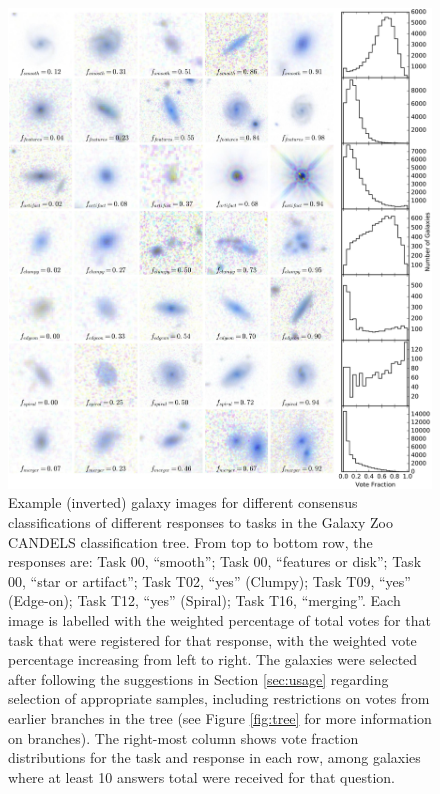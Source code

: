 \documentclass[useAMS,usenatbib]{mn2e}
\begin{document}
{%
\begin{figure}
\includegraphics[scale=0.875]{mosaic_inv_with_hists_sm2.png}
\caption{
Example (inverted) galaxy images for different consensus classifications of different responses to tasks in the Galaxy Zoo CANDELS classification tree. From top to bottom row, the responses are: Task 00, ``smooth''; Task 00, ``features or disk''; Task 00, ``star or artifact''; Task T02, ``yes'' (Clumpy); Task T09, ``yes'' (Edge-on); Task T12, ``yes'' (Spiral); Task T16, ``merging''. Each image is labelled with the weighted percentage of total votes for that task that were registered for that response, with the weighted vote percentage increasing from left to right. The galaxies were selected after following the suggestions in Section \ref{sec:usage} regarding selection of appropriate samples, including restrictions on votes from earlier branches in the tree (see Figure \ref{fig:tree} for more information on branches). The right-most column shows vote fraction distributions for the task and response in each row, among galaxies where at least 10 answers total were received for that question.
}
\label{fig:exampleclass}
\end{figure}







}
\end{document}
